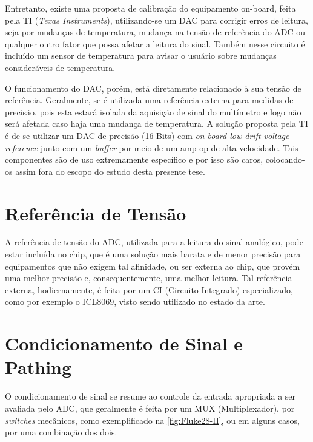 Entretanto, existe uma proposta de calibração do equipamento on-board, feita pela \gls{TI} (\textit{Texas Instruments}), utilizando-se um \gls{DAC} para corrigir erros de leitura, seja por mudanças de temperatura, mudança na tensão de referência do \gls{ADC} ou qualquer outro fator que possa afetar a leitura do sinal. Também nesse circuito é incluído um sensor de temperatura para avisar o usuário sobre mudanças consideráveis de temperatura.

O funcionamento do \gls{DAC}, porém, está diretamente relacionado à sua tensão de referência. Geralmente, se é utilizada uma referência externa para medidas de precisão, pois esta estará isolada da aquisição de sinal do multímetro e logo não será afetada caso haja uma mudança de temperatura. A solução proposta pela \gls{TI} é de se utilizar um \gls{DAC} de precisão (16-Bits) com \textit{on-board low-drift voltage reference} junto com um \textit{buffer} por meio de um \gls{amp-op} de alta velocidade. Tais componentes são de uso extremamente específico e por isso são caros, colocando-os assim fora do escopo do estudo desta presente tese. %

\section{Referência de Tensão}\label{sec:VoltageReference}

A referência de tensão do ADC, utilizada para a leitura do sinal analógico, pode estar incluída no chip, que é uma solução mais barata e de menor precisão para equipamentos que não exigem tal afinidade, ou ser externa ao chip, que provém uma melhor precisão e, consequentemente, uma melhor leitura. Tal referência externa, hodiernamente, é feita por um \gls{CI} (Circuito Integrado) especializado, como por exemplo o ICL8069, visto sendo utilizado no estado da arte. %


\section{Condicionamento de Sinal e Pathing}\label{sec:signalConditioningandPathing}

O condicionamento de sinal se resume ao controle da entrada apropriada a ser avaliada pelo ADC, que geralmente é feita por um \gls{MUX} (Multiplexador), por \textit{switches} mecânicos, como exemplificado na \autoref{fig:Fluke28-II}, ou em alguns casos, por uma combinação dos dois.  

